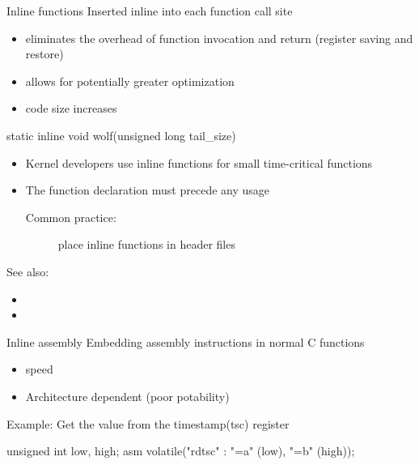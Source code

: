\begin{frame}[fragile=singleslide]
  \begin{block}{Inline functions}
    Inserted inline into each function call site
    \begin{itemize}
    \item[\good] eliminates the overhead of function invocation and return (register saving and
      restore)
    \item[\good] allows for potentially greater optimization
    \item[\bad] code size increases
    \end{itemize}
  \end{block}
  \begin{center}
  \begin{ccode}
static inline void wolf(unsigned long tail_size)
\end{ccode}
  \end{center}
  \begin{itemize}
  \item Kernel developers use inline functions for small time-critical functions
  \item The function declaration must precede any usage
    \begin{description}
    \item[Common practice:] place inline functions in header files
    \end{description}
  \end{itemize}
\end{frame}

See also:
\begin{itemize}
\item {}
\item {}
\end{itemize}

\begin{frame}[fragile=singleslide]
  \begin{block}{Inline assembly}
    Embedding assembly instructions in normal C functions
    \begin{itemize}
    \item[\good] speed
    \item[\bad] Architecture dependent (poor potability)
    \end{itemize}
  \end{block}
  \begin{block}{Example: Get the value from the timestamp(tsc) register}
    \begin{center}
\begin{ccode}
unsigned int low, high;
asm volatile("rdtsc" : "=a" (low), "=b" (high));
\end{ccode}
    \end{center}
  \end{block}
\end{frame}

